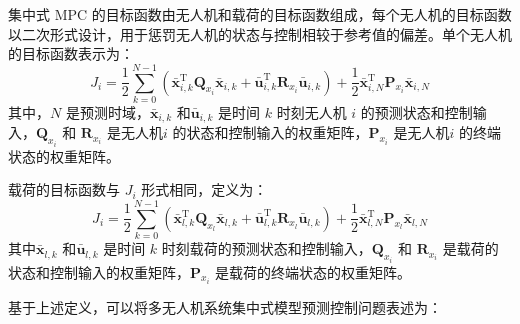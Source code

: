 \documentclass[lang=chs, degree=master, blindreview=false, winfonts=true]{yanputhesis}
\begin{document}
集中式 MPC 的目标函数由无人机和载荷的目标函数组成，每个无人机的目标函数以二次形式设计，用于惩罚无人机的状态与控制相较于参考值的偏差。单个无人机的目标函数表示为：
\begin{equation}
	J_i = \frac{1}{2}\sum_{k=0}^{N-1}\left(\bar{\boldsymbol{x}}_{i,k}^\mathrm{T}\boldsymbol{Q}_{x_i}\bar{\boldsymbol{x}}_{i,k}+\bar{\boldsymbol{u}}_{i,k}^\mathrm{T}\boldsymbol{R}_{x_i}\bar{\boldsymbol{u}}_{i,k}\right)+\frac{1}{2}\bar{\boldsymbol{x}}_{i,N}^\mathrm{T}\boldsymbol{P}_{x_i}\bar{\boldsymbol{x}}_{i,N}
	\label{juav}
\end{equation}
其中，$N$ 是预测时域，$\bar{\boldsymbol{x}}_{i,k}$ 和$\bar{\boldsymbol{u}}_{i,k}$ 是时间 $k$ 时刻无人机 $i$ 的预测状态和控制输入，$\boldsymbol{Q}_{x_i}$ 和 $\boldsymbol{R}_{x_i}$ 是无人机$i$ 的状态和控制输入的权重矩阵，$\boldsymbol{P}_{x_i}$ 是无人机$i$ 的终端状态的权重矩阵。

载荷的目标函数与 \( J_i \) 形式相同，定义为：
\begin{equation}
    J_i = \frac{1}{2}\sum_{k=0}^{N-1}\left(\bar{\boldsymbol{x}}_{l,k}^\mathrm{T}\boldsymbol{Q}_{x_l}\bar{\boldsymbol{x}}_{l,k}+\bar{\boldsymbol{u}}_{l,k}^\mathrm{T}\boldsymbol{R}_{x_l}\bar{\boldsymbol{u}}_{l,k}\right)+\frac{1}{2}\bar{\boldsymbol{x}}_{l,N}^\mathrm{T}\boldsymbol{P}_{x_l}\bar{\boldsymbol{x}}_{l,N}
	\label{jpayload}
\end{equation}
其中$\bar{\boldsymbol{x}}_{l,k}$ 和$\bar{\boldsymbol{u}}_{l,k}$ 是时间 $k$ 时刻载荷的预测状态和控制输入，$\boldsymbol{Q}_{x_i}$ 和 $\boldsymbol{R}_{x_i}$ 是载荷的状态和控制输入的权重矩阵，$\boldsymbol{P}_{x_i}$ 是载荷的终端状态的权重矩阵。


基于上述定义，可以将多无人机系统集中式模型预测控制问题表述为：
\end{document}

